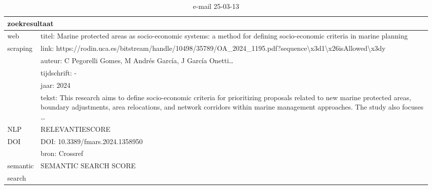 \begin{table}[h!]
    \caption{e-mail 25-03-13}
    \centering
    \begin{tabularx}{\textwidth}{|p{4cm}|X|} 
        \hline
        \multicolumn{2}{|X|}{\textbf{zoekresultaat}} \\
        \hline
        web &titel: Marine protected areas as socio-economic systems: a method for defining socio-economic criteria in marine planning\\
        scraping&link: https://rodin.uca.es/bitstream/handle/10498/35789/OA_2024_1195.pdf?sequence\textbackslash x3d1\textbackslash x26isAllowed\textbackslash x3dy\\
        &auteur: C Pegorelli Gomes, M Andrés García, J García Onetti…\\
        &tijdschrift: -\\
        &jaar: 2024\\
        &tekst: This research aims to define socio-economic criteria for prioritizing proposals related to new marine protected areas, boundary adjustments, area relocations, and network corridors within marine management approaches. The study also focuses …\\
        \hline
        NLP&RELEVANTIESCORE\\
        \hline
        DOI&DOI: 10.3389/fmars.2024.1358950\\
        &bron: Crossref\\
        \hline
        semantic&SEMANTIC SEARCH SCORE\\
        search&\\
        \hline
    \end{tabularx}
    \label{table:email20250313}
\end{table}
